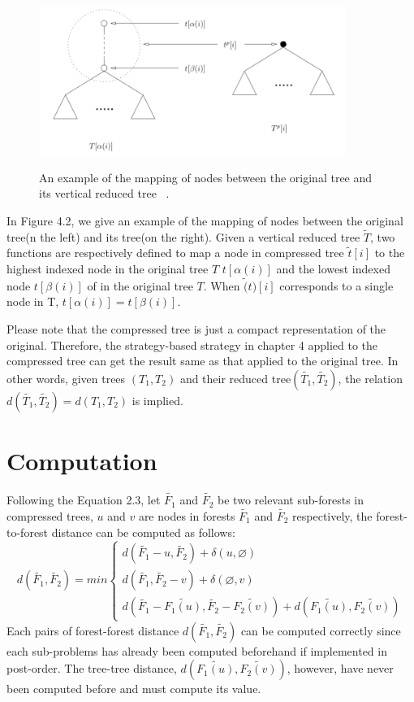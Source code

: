 \begin{figure}
		\centering
		\includegraphics[width=10cm,clip]{Figures/VReduction}
		\label{An Example of the Mapping of Nodes Between the Original Tree and its Vertical Reduced Tree} 
		\caption{An example of the mapping of nodes between the original tree and its vertical reduced tree ~\cite{Chen2014}.}
\end{figure}

In Figure 4.2, we give an example of the mapping of nodes between the original tree(n the left) and its tree(on the right). Given a vertical reduced tree $\widetilde{T}$, two functions are respectively defined to map a node in compressed tree $\widetilde{t}[i]$ to the highest indexed node in the original tree $T$ $t[\alpha(i)]$ and the lowest indexed node $t[\beta(i)]$ of in the original tree $T$.  When $\widetilde(t)[i]$ corresponds to a single node in T, $t[\alpha(i)]=t[\beta(i)]$.

Please note that the compressed tree is just a compact representation of the original. Therefore, the strategy-based strategy in chapter 4 applied to the compressed tree can get the result same as that applied to the original tree. In other words, given trees $(T_1, T_2)$ and their reduced tree$(\widetilde{T_1}, \widetilde{T_2})$, the relation $d(\widetilde{T_1}, \widetilde{T_2}) = d(T_1, T_2)$ is implied. 

\section{Computation}

Following the Equation 2.3, let $\widetilde{F_1}$ and $\widetilde{F_2}$ be two relevant sub-forests in compressed trees,  $u$ and $v$ are nodes in forests $\widetilde{F_1}$ and $\widetilde{F_2}$ respectively, the forest-to-forest distance can be computed as follows:
\begin{equation}
d(\widetilde{F_1}, \widetilde{F_2}) = min \begin{cases}
d(\widetilde{F_1} - u, \widetilde{F_2}) + \delta(u, \varnothing) \\
d(\widetilde{F_1}, \widetilde{F_2} - v) + \delta(\varnothing, v) \\
d(\widetilde{F_1} - \widetilde{F_1(u)}, \widetilde{F_2} - \widetilde{F_2(v)}) + d(\widetilde{F_1(u)}, \widetilde{F_2(v)}) 
\end{cases}
\end{equation}
Each pairs of forest-forest distance $d(\widetilde{F_1}, \widetilde{F_2})$ can be computed correctly since each sub-problems has already been computed beforehand if implemented in post-order. The tree-tree distance, $d(\widetilde{F_1(u)}, \widetilde{F_2(v)})$, however, have never been computed before and must compute its value.


